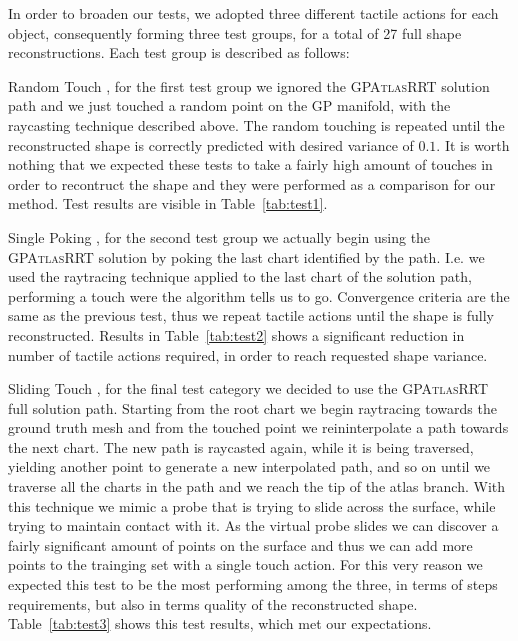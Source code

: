 In order to broaden our tests, we adopted three different tactile actions for each object, consequently forming 
three test groups, for a total of 27 full shape reconstructions. Each test group is described as follows:
\begin{asparadesc}
    \item[Random Touch], for the first test group we ignored the \textsc{GPAtlasRRT} solution path and 
        we just touched a random point on the GP manifold, with the raycasting technique described above.
        The random touching is repeated until the reconstructed shape is correctly predicted with
        desired variance of $0.1$.
        It is worth nothing that we expected these tests to take a fairly high amount of touches
        in order to recontruct the shape and they were performed as a comparison for our method.
        Test results are visible in Table~\ref{tab:test1}.
    \item[Single Poking], for the second test group we actually begin using the \textsc{GPAtlasRRT} solution by
        poking the last chart identified by the path. I.e. we used the raytracing technique applied to the last
        chart of the solution path, performing a touch were the algorithm tells us to go.
        Convergence criteria are the same as the previous test, thus we repeat tactile actions
        until the shape is fully reconstructed. Results in Table~\ref{tab:test2} shows a significant reduction
        in number of tactile actions required, in order to reach requested shape variance.
    \item[Sliding Touch],  for the  final test  category we  decided to  use the
    \textsc{GPAtlasRRT}  full solution  path. Starting  from the  root chart  we
    begin raytracing towards the ground truth mesh and from the touched point we
    reininterpolate a  path towards the next  chart. The new path  is raycasted
    again, while it is being traversed, yielding another point to generate a new interpolated path, and so
    on until we traverse all the charts in the path and we reach the tip of the atlas branch.
    With this technique we mimic a probe that is trying to slide across the surface,
    while trying to maintain contact with it. As the virtual probe slides we can discover
    a fairly significant amount of points on the surface and thus we can add more points to the trainging set
    with a single touch action. For this very reason we expected this test to be the most performing among the three,
    in terms of steps requirements, but also in terms quality of the reconstructed shape.
    Table~\ref{tab:test3} shows this test results, which met our expectations.
\end{asparadesc}
